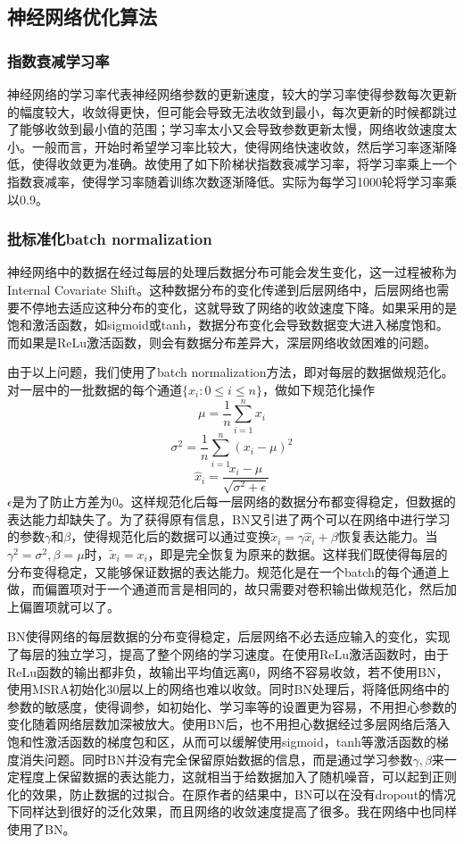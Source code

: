 \documentclass[12pt]{article}
\begin{document}
\subsection{神经网络优化算法}

\subsubsection{指数衰减学习率}
\noindent

神经网络的学习率代表神经网络参数的更新速度，较大的学习率使得参数每次更新的幅度较大，收敛得更快，但可能会导致无法收敛到最小，每次更新的时候都跳过了能够收敛到最小值的范围；学习率太小又会导致参数更新太慢，网络收敛速度太小。一般而言，开始时希望学习率比较大，使得网络快速收敛，然后学习率逐渐降低，使得收敛更为准确。故使用了如下阶梯状指数衰减学习率，将学习率乘上一个指数衰减率，使得学习率随着训练次数逐渐降低。实际为每学习1000轮将学习率乘以0.9。

\subsubsection{批标准化batch normalization}
\noindent

神经网络中的数据在经过每层的处理后数据分布可能会发生变化，这一过程被称为Internal Covariate Shift\cite{bn}。这种数据分布的变化传递到后层网络中，后层网络也需要不停地去适应这种分布的变化，这就导致了网络的收敛速度下降。如果采用的是饱和激活函数，如sigmoid或tanh，数据分布变化会导致数据变大进入梯度饱和。而如果是ReLu激活函数，则会有数据分布差异大，深层网络收敛困难的问题\cite{bn-relu}。

由于以上问题，我们使用了batch normalization方法，即对每层的数据做规范化。对一层中的一批数据的每个通道$\{x_i : 0 \le i \le n\}$，做如下规范化操作
$$\mu = \frac 1 n \sum^n_{i = 1} x_i$$
$$\sigma^2 = \frac 1 n \sum^n_{i=1}(x_i - \mu)^2$$
$$\hat{x}_i = \frac{x_i - \mu}{\sqrt{\sigma^2 + \epsilon}}$$
$\epsilon$是为了防止方差为0。这样规范化后每一层网络的数据分布都变得稳定，但数据的表达能力却缺失了。为了获得原有信息，BN又引进了两个可以在网络中进行学习的参数$\gamma$和$\beta$，使得规范化后的数据可以通过变换$\tilde{x}_i = \gamma \hat{x}_i + \beta$恢复表达能力。当$\gamma^2 = \sigma^2, \beta = \mu$时，$\tilde{x}_i = x_i$，即是完全恢复为原来的数据。这样我们既使得每层的分布变得稳定，又能够保证数据的表达能力。规范化是在一个batch的每个通道上做，而偏置项对于一个通道而言是相同的，故只需要对卷积输出做规范化，然后加上偏置项就可以了。

BN使得网络的每层数据的分布变得稳定，后层网络不必去适应输入的变化，实现了每层的独立学习，提高了整个网络的学习速度。在使用ReLu激活函数时，由于ReLu函数的输出都非负，故输出平均值远离0，网络不容易收敛，若不使用BN，使用MSRA初始化30层以上的网络也难以收敛\cite{bn-relu}。同时BN处理后，将降低网络中的参数的敏感度，使得调参，如初始化、学习率等的设置更为容易，不用担心参数的变化随着网络层数加深被放大。使用BN后，也不用担心数据经过多层网络后落入饱和性激活函数的梯度包和区，从而可以缓解使用sigmoid，tanh等激活函数的梯度消失问题。同时BN并没有完全保留原始数据的信息，而是通过学习参数$\gamma, \beta$来一定程度上保留数据的表达能力，这就相当于给数据加入了随机噪音，可以起到正则化的效果，防止数据的过拟合。在原作者的结果中，BN可以在没有dropout的情况下同样达到很好的泛化效果，而且网络的收敛速度提高了很多。\cite{bn}我在网络中也同样使用了BN。
\end{document}
